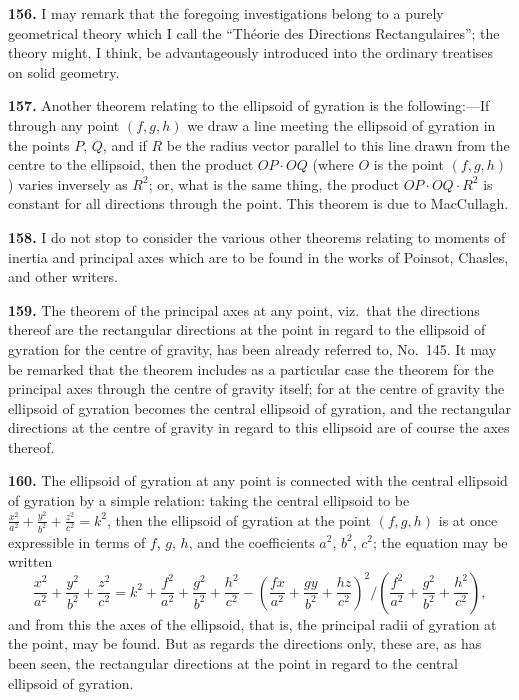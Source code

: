\documentclass[11pt,a4paper]{book}
\begin{document}
\textbf{156.} I may remark that the foregoing investigations belong to a purely geometrical theory which I call the ``Th\'eorie des Directions Rectangulaires''; the theory might, I think, be advantageously introduced into the ordinary treatises on solid geometry.

\textbf{157.} Another theorem relating to the ellipsoid of gyration is the following:---If through any point $(f, g, h)$ we draw a line meeting the ellipsoid of gyration in the points $P$, $Q$, and if $R$ be the radius vector parallel to this line drawn from the centre to the ellipsoid, then the product $OP \cdot OQ$ (where $O$ is the point $(f, g, h)$) varies inversely as $R^2$; or, what is the same thing, the product $OP \cdot OQ \cdot R^2$ is constant for all directions through the point. This theorem is due to MacCullagh.

\textbf{158.} I do not stop to consider the various other theorems relating to moments of inertia and principal axes which are to be found in the works of Poinsot, Chasles, and other writers.

\textbf{159.} The theorem of the principal axes at any point, viz.\ that the directions thereof are the rectangular directions at the point in regard to the ellipsoid of gyration for the centre of gravity, has been already referred to, No.~145. It may be remarked that the theorem includes as a particular case the theorem for the principal axes through the centre of gravity itself; for at the centre of gravity the ellipsoid of gyration becomes the central ellipsoid of gyration, and the rectangular directions at the centre of gravity in regard to this ellipsoid are of course the axes thereof.

\textbf{160.} The ellipsoid of gyration at any point is connected with the central ellipsoid of gyration by a simple relation: taking the central ellipsoid to be $\frac{x^2}{a^2} + \frac{y^2}{b^2} + \frac{z^2}{c^2} = k^2$, then the ellipsoid of gyration at the point $(f, g, h)$ is at once expressible in terms of $f$, $g$, $h$, and the coefficients $a^2$, $b^2$, $c^2$; the equation may be written
\[
\frac{x^2}{a^2} + \frac{y^2}{b^2} + \frac{z^2}{c^2} = k^2 + \frac{f^2}{a^2} + \frac{g^2}{b^2} + \frac{h^2}{c^2} - \left(\frac{fx}{a^2} + \frac{gy}{b^2} + \frac{hz}{c^2}\right)^2 \bigg/ \left(\frac{f^2}{a^2} + \frac{g^2}{b^2} + \frac{h^2}{c^2}\right),
\]
and from this the axes of the ellipsoid, that is, the principal radii of gyration at the point, may be found. But as regards the directions only, these are, as has been seen, the rectangular directions at the point in regard to the central ellipsoid of gyration.
\end{document}
